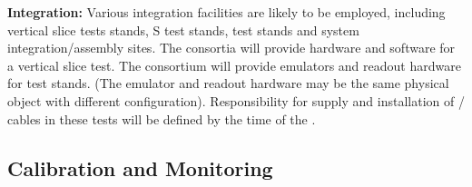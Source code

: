 \textbf{Integration:} Various integration facilities are likely to be employed, including vertical slice tests stands, S test stands,  test stands and system integration/assembly sites. The  consortia will provide hardware and software for a vertical slice test. The  consortium will provide  emulators and  readout hardware for  test stands. (The  emulator and  readout hardware may be the same physical object with different configuration). Responsibility for supply and installation of / cables in these tests will be defined by the time of the  .



\subsection{Calibration and Monitoring}
\label{sec:fdsp-pd-intfc-calib}




